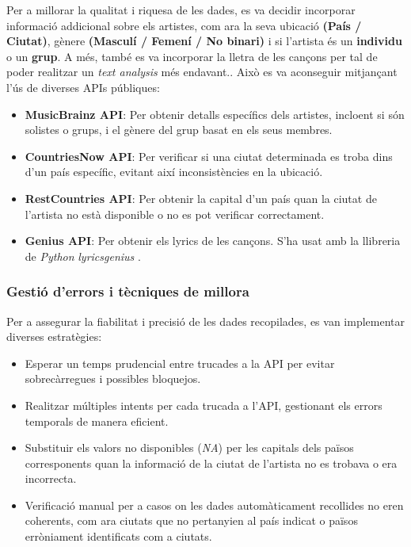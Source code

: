 Per a millorar la qualitat i riquesa de les dades, es va decidir incorporar informació addicional sobre els artistes, com ara la seva ubicació \textbf{(País / Ciutat)}, gènere \textbf{(Masculí / Femení / No binari)} i si l'artista és un \textbf{individu} o un \textbf{grup}. A més, també es va incorporar la lletra de les cançons per tal de poder realitzar un \textit{text analysis} més endavant.. Això es va aconseguir mitjançant l'ús de diverses APIs públiques:
\begin{itemize}
    \item \textbf{MusicBrainz API}: Per obtenir detalls específics dels artistes, incloent si són solistes o grups, i el gènere del grup basat en els seus membres.
    \item \textbf{CountriesNow API}: Per verificar si una ciutat determinada es troba dins d'un país específic, evitant així inconsistències en la ubicació.
    \item \textbf{RestCountries API}: Per obtenir la capital d'un país quan la ciutat de l'artista no està disponible o no es pot verificar correctament.
    \item \textbf{Genius API}: Per obtenir els lyrics de les cançons. S'ha usat amb la llibreria de \textit{Python} \textit{lyricsgenius} .
\end{itemize}

\subsubsection{Gestió d'errors i tècniques de millora}

Per a assegurar la fiabilitat i precisió de les dades recopilades, es van implementar diverses estratègies:
\begin{itemize}
    \item Esperar un temps prudencial entre trucades a la API per evitar sobrecàrregues i possibles bloquejos.
    \item Realitzar múltiples intents per cada trucada a l'API, gestionant els errors temporals de manera eficient.
    \item Substituir els valors no disponibles (\textit{NA}) per les capitals dels països corresponents quan la informació de la ciutat de l'artista no es trobava o era incorrecta.
    \item Verificació manual per a casos on les dades automàticament recollides no eren coherents, com ara ciutats que no pertanyien al país indicat o països erròniament identificats com a ciutats.
\end{itemize}

